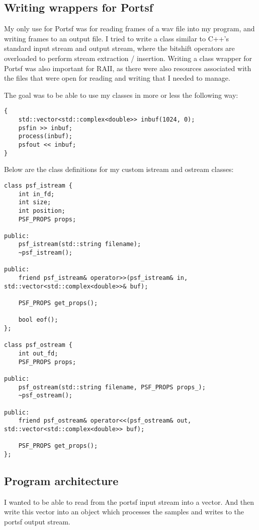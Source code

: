 \pagebreak

\subsection{Writing wrappers for Portsf}
My only use for Portsf was for reading frames of a wav file into my program,
and writing frames to an output file. 
I tried to write a class similar to C++'s standard input stream and output stream,
where the bitshift operators are overloaded to perform stream extraction / insertion.
Writing a class wrapper for Portsf was also important for RAII, as there
were also resources associated with the files that were open for reading and writing
that I needed to manage.

The goal was to be able to use my classes in more or less the following way:
\begin{verbatim}
{
    std::vector<std::complex<double>> inbuf(1024, 0);
    psfin >> inbuf;
    process(inbuf);
    psfout << inbuf;
}
\end{verbatim}

Below are the class definitions for my custom istream and ostream classes:
\begin{verbatim}
class psf_istream {
    int in_fd;
    int size;
    int position;
    PSF_PROPS props;

public:
    psf_istream(std::string filename);
    ~psf_istream();

public:
    friend psf_istream& operator>>(psf_istream& in, std::vector<std::complex<double>>& buf);

    PSF_PROPS get_props();

    bool eof();
};

class psf_ostream {
    int out_fd;
    PSF_PROPS props;

public:
    psf_ostream(std::string filename, PSF_PROPS props_);
    ~psf_ostream();

public:
    friend psf_ostream& operator<<(psf_ostream& out, std::vector<std::complex<double>> buf);

    PSF_PROPS get_props();
};
\end{verbatim}


\subsection{Program architecture}
I wanted to be able to read from the portsf input stream into a vector.
And then write this vector into an object which processes the samples and writes to the portsf output stream.

